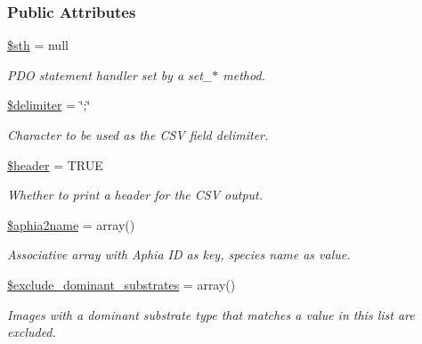 \subsubsection*{Public Attributes}
\begin{DoxyCompactItemize}
\item 
\hypertarget{classExporter_a910c25744dd81011c43aac920867b291}{\hyperlink{classExporter_a910c25744dd81011c43aac920867b291}{\$sth} = null}\label{classExporter_a910c25744dd81011c43aac920867b291}

\begin{DoxyCompactList}\small\item\em P\-D\-O statement handler set by a set\-\_\-$\ast$ method. \end{DoxyCompactList}\item 
\hypertarget{classExporter_afba79cbecf1307454bafc80a9e442afa}{\hyperlink{classExporter_afba79cbecf1307454bafc80a9e442afa}{\$delimiter} = \char`\"{};\char`\"{}}\label{classExporter_afba79cbecf1307454bafc80a9e442afa}

\begin{DoxyCompactList}\small\item\em Character to be used as the C\-S\-V field delimiter. \end{DoxyCompactList}\item 
\hypertarget{classExporter_a5b5357c605795c38227db7ffdb88ffaa}{\hyperlink{classExporter_a5b5357c605795c38227db7ffdb88ffaa}{\$header} = T\-R\-U\-E}\label{classExporter_a5b5357c605795c38227db7ffdb88ffaa}

\begin{DoxyCompactList}\small\item\em Whether to print a header for the C\-S\-V output. \end{DoxyCompactList}\item 
\hypertarget{classExporter_a2952bce65f130de4ba09e71655bdc89f}{\hyperlink{classExporter_a2952bce65f130de4ba09e71655bdc89f}{\$aphia2name} = array()}\label{classExporter_a2952bce65f130de4ba09e71655bdc89f}

\begin{DoxyCompactList}\small\item\em Associative array with Aphia I\-D as key, species name as value. \end{DoxyCompactList}\item 
\hypertarget{classExporter_af894c7d3f943ae0a52ce33ec8330726a}{\hyperlink{classExporter_af894c7d3f943ae0a52ce33ec8330726a}{\$exclude\-\_\-dominant\-\_\-substrates} = array()}\label{classExporter_af894c7d3f943ae0a52ce33ec8330726a}

\begin{DoxyCompactList}\small\item\em Images with a dominant substrate type that matches a value in this list are excluded. \end{DoxyCompactList}\end{DoxyCompactItemize}


